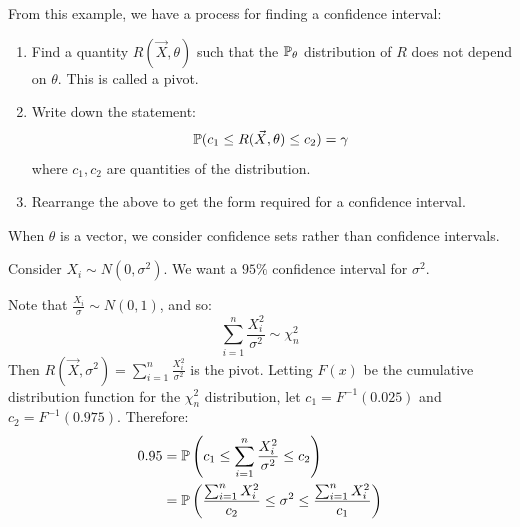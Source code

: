 \documentclass[../Main.tex]{subfiles}
\begin{document}
From this example, we have a process for finding a confidence interval:
\begin{enumerate}
    \item Find a quantity $R(\vec{X}, \theta)$ such that the $\P_\theta$ distribution of $R$ does not depend on $\theta$. This is called a pivot.
    \item Write down the statement:
        \begin{equation*}
            \P(c_1 \leq R(\vec{X}, \theta) \leq c_2) = \gamma
        \end{equation*}
        where $c_1, c_2$ are quantities of the distribution.
    \item Rearrange the above to get the form required for a confidence interval.
\end{enumerate}
\begin{remark}
    When $\theta$ is a vector, we consider confidence sets rather than confidence intervals.
\end{remark}
\begin{example}
    Consider $X_i \sim N(0, \sigma^2)$. We want a $95\%$ confidence interval for $\sigma^2$.

    Note that $\frac{X_i}{\sigma} \sim N(0, 1)$, and so:
    \begin{equation*}
        \sum_{i=1}^{n} \frac{X_i^2}{\sigma^2} \sim \chi_n^2
    \end{equation*}
    Then $R(\vec{X}, \sigma^2) = \sum_{i=1}^{n} \frac{X_i^2}{\sigma^2}$ is the pivot. Letting $F(x)$ be the cumulative distribution function for the $\chi_n^2$ distribution, let $c_1 = F^{-1}(0.025)$ and $c_2 = F^{-1}(0.975)$. Therefore:
    \begin{align*}
        0.95 &= \P\left(c_1 \leq \sum_{i=1}^{n} \frac{X_i^2}{\sigma^2} \leq c_2\right) \\
        &= \P\left(\frac{\sum_{i=1}^{n} X_i^2}{c_2} \leq \sigma^2 \leq \frac{\sum_{i=1}^{n} X_i^2}{c_1}\right)
    \end{align*}
\end{example}
\end{document}
